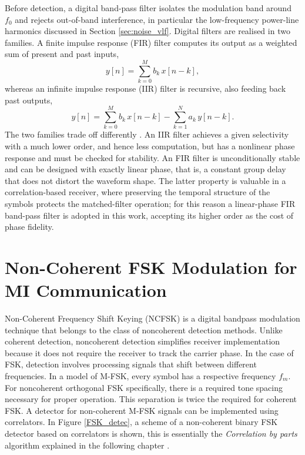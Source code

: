 Before detection, a digital band-pass filter isolates the modulation band around
$f_0$ and rejects out-of-band interference, in particular the low-frequency
power-line harmonics discussed in Section \ref{sec:noise_vlf}. Digital filters are
realised in two families. A finite impulse response (FIR) filter computes its
output as a weighted sum of present and past inputs,
\begin{equation}
    y[n] = \sum_{k=0}^{M} b_k\, x[n-k],
    \label{eq:fir}
\end{equation}
whereas an infinite impulse response (IIR) filter is recursive, also feeding back
past outputs,
\begin{equation}
    y[n] = \sum_{k=0}^{M} b_k\, x[n-k] - \sum_{k=1}^{N} a_k\, y[n-k].
    \label{eq:iir}
\end{equation}
The two families trade off differently \cite{lyons2011}. An IIR filter achieves a
given selectivity with a much lower order, and hence less computation, but has a
nonlinear phase response and must be checked for stability. An FIR filter is
unconditionally stable and can be designed with exactly linear phase, that is, a
constant group delay that does not distort the waveform shape. The latter property
is valuable in a correlation-based receiver, where preserving the temporal
structure of the symbols protects the matched-filter operation; for this reason a linear-phase FIR band-pass filter is adopted in this work, accepting its higher order as the cost of phase
fidelity.
\section{Non-Coherent FSK Modulation for MI Communication}\label{sec:noncoherent-fsk}

Non-Coherent Frequency Shift Keying (NCFSK) is a digital bandpass modulation technique that belongs to the class of noncoherent detection methods. Unlike coherent detection, noncoherent detection simplifies receiver implementation because it does not require the receiver to track the carrier phase.
\newp
In the case of FSK, detection involves processing signals that shift between different frequencies. In a model of M-FSK, every symbol has a respective frequency $f_m$. For noncoherent orthogonal FSK specifically, there is a required tone spacing necessary for proper operation. This separation is twice the required for coherent FSK.
\newp
A detector for non-coherent M-FSK signals can be implemented using correlators. In Figure \ref{FSK_detec}, a scheme of a non-coherent binary FSK detector based on correlators is shown, this is essentially the \textit{Correlation by parts} algorithm explained in the following chapter \cite{sklar2021digital}.

